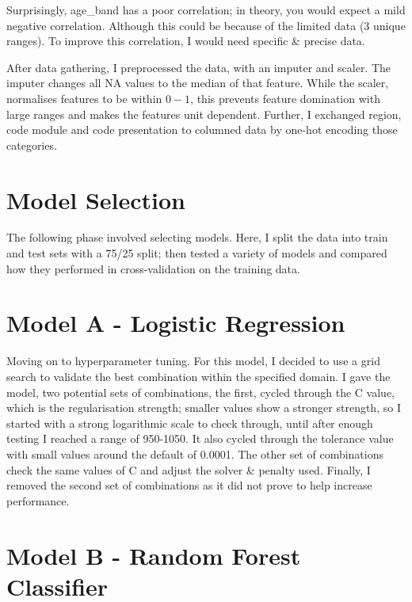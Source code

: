 \documentclass[11pt, a4paper, twocolumn]{article}
\begin{document}
Surprisingly, age\_band has a poor correlation; in theory, you would expect a mild negative correlation. Although this could be because of the limited data (3 unique ranges). To improve this correlation, I would need specific \& precise data.

After data gathering, I preprocessed the data, with an imputer and scaler. The imputer changes all NA values to the median of that feature. 
While the scaler, normalises features to be within $0-1$, this prevents feature domination with large ranges and makes the features unit dependent.
Further, I exchanged region, code module and code presentation to columned data by one-hot encoding those categories.

\section{Model Selection}

The following phase involved selecting models. Here, I split the data into train and test sets with a 75/25 split; then tested a variety of models and compared how they performed in cross-validation on the training data. 



\section{Model A - Logistic Regression}

Moving on to hyperparameter tuning. For this model, I decided to use a grid search to validate the best combination within the specified domain. 
I gave the model, two potential sets of combinations, the first, cycled through the C value, which is the regularisation strength; smaller values show a stronger strength, 
so I started with a strong logarithmic scale to check through, until after enough testing I reached a range of 950-1050. It also cycled through the tolerance value with small values around the default of 0.0001.
The other set of combinations check the same values of C and adjust the solver \& penalty used. Finally, I removed the second set of combinations as it did not prove to help increase performance.

\section{Model B - Random Forest Classifier}
\end{document}
